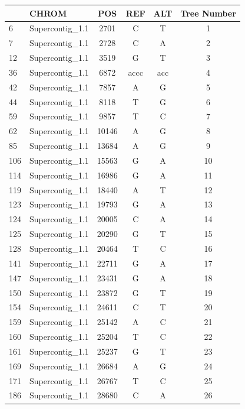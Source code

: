 \documentclass{article}\usepackage[]{graphicx}\usepackage[]{color}
\begin{document}
\begin{table}[ht]
\centering
\begin{tabular}{llcccc}
  \hline
 & CHROM & POS & REF & ALT & Tree Number \\ 
  \hline
6 & Supercontig\_1.1 & 2701 & C & T &   1 \\ 
  7 & Supercontig\_1.1 & 2728 & C & A &   2 \\ 
  12 & Supercontig\_1.1 & 3519 & G & T &   3 \\ 
  36 & Supercontig\_1.1 & 6872 & accc & acc &   4 \\ 
  42 & Supercontig\_1.1 & 7857 & A & G &   5 \\ 
  44 & Supercontig\_1.1 & 8118 & T & G &   6 \\ 
  59 & Supercontig\_1.1 & 9857 & T & C &   7 \\ 
  62 & Supercontig\_1.1 & 10146 & A & G &   8 \\ 
  85 & Supercontig\_1.1 & 13684 & A & G &   9 \\ 
  106 & Supercontig\_1.1 & 15563 & G & A &  10 \\ 
  114 & Supercontig\_1.1 & 16986 & G & A &  11 \\ 
  119 & Supercontig\_1.1 & 18440 & A & T &  12 \\ 
  123 & Supercontig\_1.1 & 19793 & G & A &  13 \\ 
  124 & Supercontig\_1.1 & 20005 & C & A &  14 \\ 
  125 & Supercontig\_1.1 & 20290 & G & T &  15 \\ 
  128 & Supercontig\_1.1 & 20464 & T & C &  16 \\ 
  141 & Supercontig\_1.1 & 22711 & G & A &  17 \\ 
  147 & Supercontig\_1.1 & 23431 & G & A &  18 \\ 
  150 & Supercontig\_1.1 & 23872 & G & T &  19 \\ 
  154 & Supercontig\_1.1 & 24611 & C & T &  20 \\ 
  159 & Supercontig\_1.1 & 25142 & A & C &  21 \\ 
  160 & Supercontig\_1.1 & 25204 & T & C &  22 \\ 
  161 & Supercontig\_1.1 & 25237 & G & T &  23 \\ 
  169 & Supercontig\_1.1 & 26684 & A & G &  24 \\ 
  171 & Supercontig\_1.1 & 26767 & T & C &  25 \\ 
  186 & Supercontig\_1.1 & 28680 & C & A &  26 \\ 

\end{tabular}
\end{table}
\end{document}
